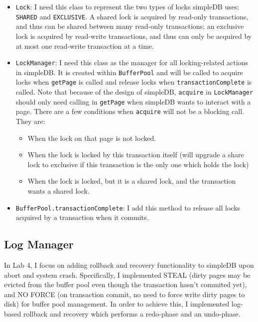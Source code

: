 \documentclass[12pt]{myland}
\begin{document}
	\begin{itemize}
        \item \texttt{Lock}: I need this class to represent the two types of locks simpleDB uses: \texttt{SHARED} and
            \texttt{EXCLUSIVE}. A shared lock is acquired by read-only transactions, and thus can be shared between
            many read-only transactions; an exclusive lock is acquired by read-write transactions, and thus can only be
            acquired by at most one read-write transaction at a time.
        \item \texttt{LockManager}: I need this class as the manager for all locking-related actions in simpleDB. It
            is created within \texttt{BufferPool} and will be called to acquire locks when \texttt{getPage} is called
            and release locks when \texttt{transactionComplete} is called. Note that because of the design of simpleDB,
            \texttt{acquire} in \texttt{LockManager} should only need calling in \texttt{getPage} when simpleDB wants to
            interact with a page. There are a few conditions when \texttt{acquire} will not be a blocking call. They are:
                \begin{itemize}
                    \item When the lock on that page is not locked.
                    \item When the lock is locked by this transaction itself (will upgrade a share lock to
                        exclusive if this transaction is the only one which holds the lock)
                    \item When the lock is locked, but it is a shared lock, and the transaction wants a shared lock.
                \end{itemize}
        \item \texttt{BufferPool.transactionComplete}: I add this method to release all locks acquired by a
            transaction when it commits.
	\end{itemize}

    \subsection{Log Manager}
    In Lab 4, I focus on adding rollback and recovery functionality to simpleDB upon abort and system crash.
    Specifically, I implemented STEAL (dirty pages may be evicted from the buffer pool even though the transaction
    hasn't commited yet), and NO FORCE (on transaction commit, no need to force write dirty pages to disk) for buffer
    pool management. In order to achieve this, I implemented log-based rollback and recovery which performs a
    redo-phase and an undo-phase. \par
\end{document}

